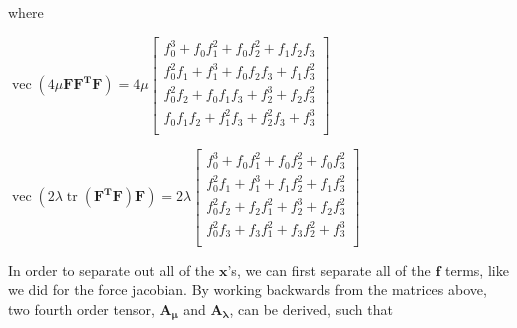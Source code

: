 \documentclass[twocolumn,10pt]{asme2ej}
\DeclareMathOperator{\vect}{vec}
\DeclareMathOperator{\tr}{tr}
\begin{document}
where

\begin{center}
  $\vect \left( 4\mu\bm{FF^TF} \right) = 4\mu
  \begin{bmatrix}
    f_{0}^3 + f_0f_{1}^2 + f_0f_{2}^2 + f_1f_2f_3 \\
    f_{0}^2f_{1} + f_{1}^3 + f_0f_2f_3 + f_1f_{3}^2 \\
    f_{0}^2f_{2} + f_0f_1f_3 + f_{2}^3 + f_2f_{3}^2 \\
    f_0f_1f_2 + f_{1}^2f_3 + f_{2}^2f_3 + f_{3}^3 \\
    \end{bmatrix}$

    \bigskip
    $\vect \left( 2\lambda\tr\left(\bm{F^TF}\right)\bm{F} \right) = 2\lambda
    \begin{bmatrix}
      f_{0}^3 + f_0f_{1}^2 + f_0f_{2}^2 + f_0f_{3}^2 \\
      f_{0}^2f_1 + f_{1}^3 + f_1f_{2}^2 + f_1f_{3}^2 \\
      f_{0}^2f_2 + f_2f_{1}^2 + f_{2}^3 + f_2f_{3}^2 \\
      f_{0}^2f_3 + f_3f_{1}^2 + f_3f_{2}^2 + f_{3}^3\\
      \end{bmatrix}$
\end{center}

In order to separate out all of the $\bm{x}$'s, we can first separate all of the $\bm{f}$ terms, like we did for the force jacobian. By working backwards from the matrices above, two fourth order tensor, $\bm{A_{\mu}}$ and $\bm{A_{\lambda}}$, can be derived, such that
\end{document}
